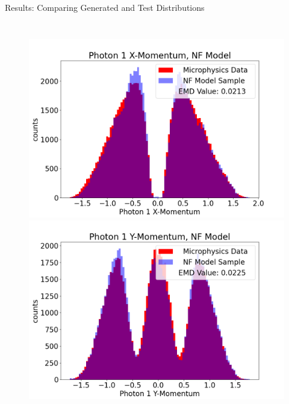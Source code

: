\documentclass[aspectratio=169]{beamer}
\begin{document}
\begin{frame}{Results: Comparing Generated and Test Distributions}
\begin{columns}
             \begin{figure}[H]
            \centering
            \includegraphics[width=.97\textwidth]{images/Features16/Photon_1_X-Momentum,_NF_Model.png}
            \includegraphics[width=.97\textwidth]{images/Features16/Photon_1_Y-Momentum,_NF_Model.png}
            \end{figure}
    \end{columns}
\end{frame}
\end{document}
